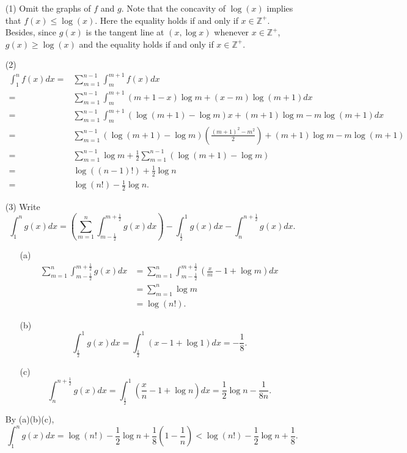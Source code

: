 \documentclass{article}
\begin{document}
\begin{enumerate}
\item[(1)]
Omit the  graphs of $f$ and $g$.
Note that the concavity of $\log(x)$ implies that $f(x) \leq \log(x)$.
Here the equality holds if and only if $x \in \mathbb{Z}^+$.
Besides, since
$g(x)$ is the tangent line at $(x, \log x)$ whenever $x \in \mathbb{Z}^+$,
$g(x) \geq \log(x)$ and
the equality holds if and only if $x \in \mathbb{Z}^+$.

\item[(2)]
\begin{align*}
  \int_{1}^{n} f(x)dx
  =& \sum_{m=1}^{n-1} \int_{m}^{m+1} f(x)dx \\
  =& \sum_{m=1}^{n-1} \int_{m}^{m+1} (m+1-x) \log m + (x-m) \log(m+1) dx \\
  =& \sum_{m=1}^{n-1} \int_{m}^{m+1}
    (\log(m+1)-\log m)x + (m+1)\log m-m\log(m+1) dx \\
  =& \sum_{m=1}^{n-1} (\log(m+1)-\log m)\left( \frac{(m+1)^2-m^2}{2} \right)
    + (m+1)\log m - m\log(m+1) \\
  =& \sum_{m=1}^{n-1} \log m + \frac{1}{2} \sum_{m=1}^{n-1}(\log(m+1)-\log m) \\
  =& \log((n-1)!) + \frac{1}{2} \log n \\
  =& \log(n!) - \frac{1}{2} \log n.
\end{align*}

\item[(3)]
Write
\[
  \int_{1}^{n} g(x)dx
  = \left( \sum_{m=1}^{n} \int_{m-\frac{1}{2}}^{m+\frac{1}{2}} g(x)dx \right)
    - \int_{\frac{1}{2}}^{1} g(x)dx
    - \int_{n}^{n+\frac{1}{2}} g(x)dx.
\]
  \begin{enumerate}
  \item[(a)]
    \begin{align*}
      \sum_{m=1}^{n} \int_{m-\frac{1}{2}}^{m+\frac{1}{2}} g(x) dx
      &=
      \sum_{m=1}^{n} \int_{m-\frac{1}{2}}^{m+\frac{1}{2}}
        \left( \frac{x}{m} - 1 + \log m \right) dx \\
      &=
      \sum_{m=1}^{n} \log m \\
      &= \log(n!).
    \end{align*}
  \item[(b)]
    \[
      \int_{\frac{1}{2}}^{1} g(x)dx
      = \int_{\frac{1}{2}}^{1} (x - 1 + \log 1) dx
      = -\frac{1}{8}.
    \]
  \item[(c)]
    \[
      \int_{n}^{n+\frac{1}{2}} g(x)dx
      = \int_{\frac{1}{2}}^{1} \left( \frac{x}{n} - 1 + \log n \right) dx
      = \frac{1}{2} \log n - \frac{1}{8n}.
    \]
  \end{enumerate}
By (a)(b)(c),
\[
  \int_{1}^{n} g(x)dx
  = \log(n!) - \frac{1}{2} \log n + \frac{1}{8}(1 - \frac{1}{n})
  < \log(n!) - \frac{1}{2} \log n + \frac{1}{8}.
\]


\end{enumerate}
\end{document}
